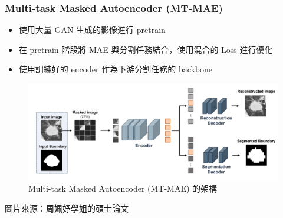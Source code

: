 \documentclass[xcolor=dvipsnames]{beamer}
\begin{document}
    \begin{frame}
        \frametitle{Multi-task Masked Autoencoder (MT-MAE)}
        \begin{itemize}
            \item 使用大量 GAN 生成的影像進行 pretrain
            \item 在 pretrain 階段將 MAE 與分割任務結合，使用混合的 Loss 進行優化
            \item 使用訓練好的 encoder 作為下游分割任務的 backbone
        \end{itemize}
    \end{frame}

    \begin{frame}
        \begin{figure}
            \centering
            \includegraphics[width=1\textwidth]{src/MTMAE.png}
            \caption{Multi-task Masked Autoencoder (MT-MAE) 的架構}
            \label{fig:mtmae_architecture}
        \end{figure}
        圖片來源：周姵妤學姐的碩士論文
    \end{frame}
\end{document}
